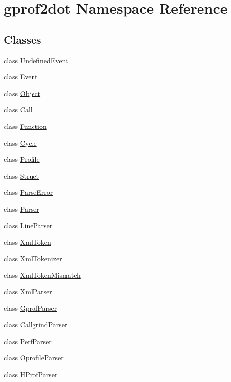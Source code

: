 \hypertarget{namespacegprof2dot}{
\section{gprof2dot Namespace Reference}
\label{namespacegprof2dot}
}
\subsection*{Classes}
\begin{DoxyCompactItemize}
\item 
class \hyperlink{classgprof2dot_1_1UndefinedEvent}{UndefinedEvent}
\item 
class \hyperlink{classgprof2dot_1_1Event}{Event}
\item 
class \hyperlink{classgprof2dot_1_1Object}{Object}
\item 
class \hyperlink{classgprof2dot_1_1Call}{Call}
\item 
class \hyperlink{classgprof2dot_1_1Function}{Function}
\item 
class \hyperlink{classgprof2dot_1_1Cycle}{Cycle}
\item 
class \hyperlink{classgprof2dot_1_1Profile}{Profile}
\item 
class \hyperlink{classgprof2dot_1_1Struct}{Struct}
\item 
class \hyperlink{classgprof2dot_1_1ParseError}{ParseError}
\item 
class \hyperlink{classgprof2dot_1_1Parser}{Parser}
\item 
class \hyperlink{classgprof2dot_1_1LineParser}{LineParser}
\item 
class \hyperlink{classgprof2dot_1_1XmlToken}{XmlToken}
\item 
class \hyperlink{classgprof2dot_1_1XmlTokenizer}{XmlTokenizer}
\item 
class \hyperlink{classgprof2dot_1_1XmlTokenMismatch}{XmlTokenMismatch}
\item 
class \hyperlink{classgprof2dot_1_1XmlParser}{XmlParser}
\item 
class \hyperlink{classgprof2dot_1_1GprofParser}{GprofParser}
\item 
class \hyperlink{classgprof2dot_1_1CallgrindParser}{CallgrindParser}
\item 
class \hyperlink{classgprof2dot_1_1PerfParser}{PerfParser}
\item 
class \hyperlink{classgprof2dot_1_1OprofileParser}{OprofileParser}
\item 
class \hyperlink{classgprof2dot_1_1HProfParser}{HProfParser}

\end{DoxyCompactItemize}

